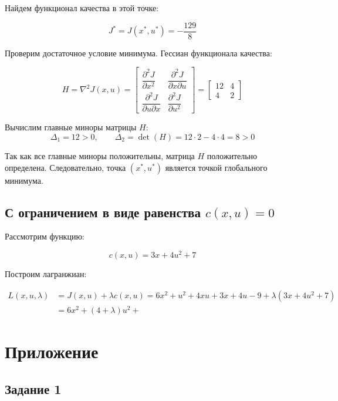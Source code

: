 \documentclass[a4paper,12pt]{article}
\begin{document}
Найдем функционал качества в этой точке:

\[
J^* = J(x^*,u^*) = - 	\dfrac{129}{8}
\]

Проверим достаточное условие минимума. Гессиан функционала качества:	
	
\[
H = \nabla^2 J(x,u) = 
\begin{bmatrix}
	\dfrac{\partial^2 J}{\partial x^2} & \dfrac{\partial^2 J}{\partial x \partial u} \\[8pt]
	\dfrac{\partial^2 J}{\partial u \partial x} & \dfrac{\partial^2 J}{\partial u^2}
\end{bmatrix}
= 
\begin{bmatrix}
	12 & 4 \\
	4 & 2
\end{bmatrix}
\]	
	
Вычислим главные миноры матрицы $H$:
\[
\Delta_1 = 12 > 0, \qquad 
\Delta_2 = \det(H) = 12 \cdot 2 - 4 \cdot 4 = 8 > 0
\]	
	
Так как все главные миноры положительны, матрица $H$ положительно определена. 
Следовательно, точка $(x^*, u^*)$ является точкой глобального минимума.	
	
	
\subsection{С ограничением в виде равенства \(c(x,u) = 0\)}	
	
	Рассмотрим функцию:
	
	\[c(x,u) = 3x + 4u^2 + 7\]
	
	Построим лагранжиан:
	
	\[\begin{aligned}
		L( x, u, \lambda) 
		&= J(x, u) + \lambda c(x,u) = 6x^2 + u^2 + 4xu + 3x + 4u - 9 + \lambda (3x + 4u^2 + 7) \\
		&= 6x^2 + (4+\lambda)u^2 +
	\end{aligned}\]
	
	
	
	
	
	
	
	
	
	
	
	
	
	
	
	
	
	
	
	
	
	
	
	
	
	
	
	
	
	
	
	
	
	
	
	
	
	
	

	
\newpage
\section{Приложение}

\subsection*{Задание 1}

\begin{lstlisting}[caption={Инициализация}]

\end{lstlisting}

	
\end{document}
